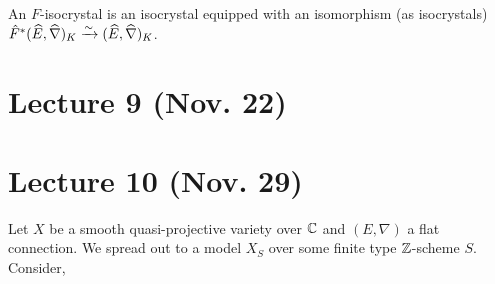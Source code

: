 \documentclass[12pt]{article}
\begin{document}
\begin{defn}
An $F$-isocrystal is an isocrystal equipped with an isomorphism (as isocrystals) $\hat{F}^* (\widehat{E}, \widehat{\nabla})_K \xrightarrow{\sim} (\widehat{E}, \widehat{\nabla})_K$.
\end{defn}


\section{Lecture 9 (Nov. 22)}



\section{Lecture 10 (Nov. 29)}

Let $X$ be a smooth quasi-projective variety over $\mathbb{C}$ and $(E, \nabla)$ a flat connection. We spread out to a model $X_S$ over some finite type $\mathbb{Z}$-scheme $S$. Consider,
\begin{center}
\end{center}
\end{document}
